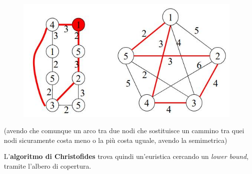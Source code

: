 \begin{esempio}
\begin{figure}[H]
																      			\includegraphics[scale = 0.4]{img/ch6.jpg}
																      		\end{figure}
																      		(avendo che comunque un arco tra due nodi che sostituisce un cammino tra quei
																      		nodi sicuramente costa meno o la più costa uguale, avendo la semimetrica)
																      	\end{esempio}
																      	L'\textbf{algoritmo di Christofides} trova quindi un'euristica cercando un
																      	\textit{lower bound}, tramite l'albero di copertura.\\
